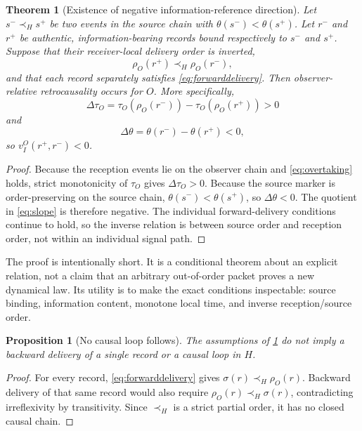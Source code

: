 \documentclass[11pt]{article}
\newtheorem{theorem}{Theorem}[section]
\newtheorem{proposition}{Proposition}[section]
\theoremstyle{remark}
\newcommand{\host}{\prec_{\!H}}
\begin{document}
\begin{theorem}[Existence of negative information-reference direction]
\label{thm:existence}
Let $s^-\host s^+$ be two events in the source chain with
$\theta(s^-)<\theta(s^+)$. Let $r^-$ and $r^+$ be authentic,
information-bearing records bound respectively to $s^-$ and $s^+$. Suppose
that their receiver-local delivery order is inverted,
\begin{equation}
  \rho_O(r^+)\host\rho_O(r^-),
  \label{eq:overtaking}
\end{equation}
and that each record separately satisfies \cref{eq:forwarddelivery}. Then
observer-relative retrocausality occurs for $O$. More specifically,
\begin{equation}
  \Delta\tau_O=
  \tau_O(\rho_O(r^-))-\tau_O(\rho_O(r^+))>0
\end{equation}
and
\begin{equation}
  \Delta\theta=\theta(r^-)-\theta(r^+)<0,
\end{equation}
so $v_I^O(r^+,r^-)<0$.
\end{theorem}

\begin{proof}
Because the reception events lie on the observer chain and
\cref{eq:overtaking} holds, strict monotonicity of $\tau_O$ gives
$\Delta\tau_O>0$. Because the source marker is order-preserving on the
source chain, $\theta(s^-)<\theta(s^+)$, so $\Delta\theta<0$. The quotient
in \cref{eq:slope} is therefore negative. The individual forward-delivery
conditions continue to hold, so the inverse relation is between source order
and reception order, not within an individual signal path.
\end{proof}

The proof is intentionally short. It is a conditional theorem about an
explicit relation, not a claim that an arbitrary out-of-order packet proves a
new dynamical law. Its utility is to make the exact conditions inspectable:
source binding, information content, monotone local time, and inverse
reception/source order.

\begin{proposition}[No causal loop follows]
\label{prop:noloop}
The assumptions of \cref{thm:existence} do not imply a backward delivery of a
single record or a causal loop in $H$.
\end{proposition}

\begin{proof}
For every record, \cref{eq:forwarddelivery} gives
$\sigma(r)\host\rho_O(r)$. Backward delivery of that same record would also
require $\rho_O(r)\host\sigma(r)$, contradicting irreflexivity by
transitivity. Since $\host$ is a strict partial order, it has no closed
causal chain.
\end{proof}
\end{document}
